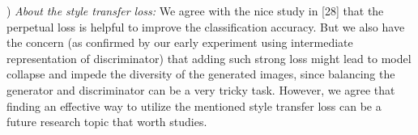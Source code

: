 \documentclass[10pt,twocolumn,letterpaper]{article}
\begin{document}


) \textit{About the style transfer loss:} 
We agree with the nice study in [28] that the perpetual loss is helpful to improve the classification accuracy.
But we also have the concern (as confirmed by our early experiment using intermediate representation of discriminator) that adding such strong loss might lead to model collapse and impede the diversity of the generated images, since balancing the generator and discriminator can be a very tricky task. However, we agree that finding an effective way to utilize the mentioned style transfer loss can be a future research topic that worth studies. 
 


\end{document}

